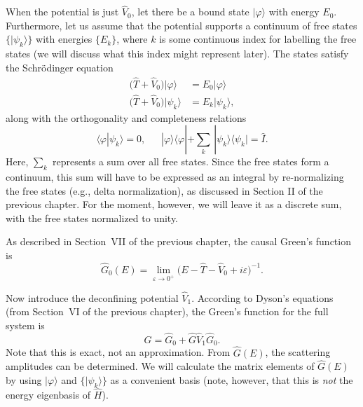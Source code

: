 \documentclass[pra,12pt]{revtex4}
\begin{document}
When the potential is just $\hat{V}_0$, let there be a bound state
$|\varphi\rangle$ with energy $E_0$.  Furthermore, let us assume that
the potential supports a continuum of free states $\{|\psi_k\rangle\}$
with energies $\{E_k\}$, where $k$ is some continuous index for
labelling the free states (we will discuss what this index might
represent later).  The states satisfy the Schr\"odinger equation
\begin{align}
  \big(\hat{T} + \hat{V}_0\big) |\varphi\rangle \; &= E_0 |\varphi\rangle \\ \big(\hat{T} + \hat{V}_0\big) |\psi_k\rangle &= E_k |\psi_k\rangle,
\end{align}
along with the orthogonality and completeness relations
\begin{equation}
  \langle\varphi|\psi_k\rangle = 0, \;\;\quad |\varphi\rangle\langle\varphi|
  + \sum_k \, |\psi_k\rangle\langle\psi_k| = \hat{I}.
\end{equation}
Here, $\sum_k$ represents a sum over all free states.  Since the free
states form a continuum, this sum will have to be expressed as an
integral by re-normalizing the free states (e.g., delta
normalization), as discussed in Section II of the previous chapter.
For the moment, however, we will leave it as a discrete sum, with the
free states normalized to unity.

As described in Section~VII of the previous chapter, the causal
Green's function is
\begin{equation}
  \hat{G}_0(E) = \lim_{\varepsilon\rightarrow0^+} \Big(E - \hat{T} - \hat{V}_0 + i\varepsilon\Big)^{-1}.
\end{equation}

Now introduce the deconfining potential $\hat{V}_1$.  According to
Dyson's equations (from Section~VI of the previous chapter), the
Green's function for the full system is
\begin{equation}
  \hat{G} = \hat{G}_0 + \hat{G} \hat{V}_1 \hat{G}_0.
\end{equation}
Note that this is exact, not an approximation.  From $\hat{G}(E)$, the
scattering amplitudes can be determined.  We will calculate the matrix
elements of $\hat{G}(E)$ by using $|\varphi\rangle$ and
$\{|\psi_k\rangle\}$ as a convenient basis (note, however, that this
is \textit{not} the energy eigenbasis of $\hat{H}$).
\end{document}
